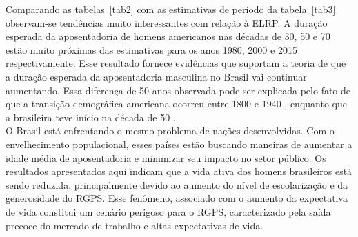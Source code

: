 \documentclass[12pt, 						%
			openright, 					%
			twoside,					%
			a4paper,x					%
			english,					%
			brazil]{abntex2}				%
\begin{document}
	Comparando as tabelas~\ref{tab2} com as estimativas de período da tabela~\ref{tab3} observam-se tendências muito interessantes com relação à ELRP. A duração esperada da aposentadoria de homens americanos nas décadas de 30, 50 e 70 estão muito próximas das estimativas para os anos 1980, 2000 e 2015 respectivamente. Esse resultado fornece evidências que suportam a teoria de que a duração esperada da aposentadoria masculina no Brasil  vai continuar aumentando. Essa diferença de 50 anos observada pode ser explicada pelo fato de que a transição demográfica americana ocorreu entre 1800 e 1940 \cite{greenwood2002us}, enquanto que a brasileira teve início na década de 50 \cite{vasconcelos2012transiccao}. \\
	O Brasil está enfrentando o mesmo problema de nações desenvolvidas. Com o envelhecimento populacional, esses países estão buscando maneiras de aumentar a idade média de aposentadoria e minimizar seu impacto no setor público. Os resultados apresentados aqui indicam que a vida ativa dos homens brasileiros está sendo reduzida, principalmente devido ao aumento do nível de escolarização e da generosidade do RGPS. Esse fenômeno, associado com o aumento da expectativa de vida constitui um cenário perigoso para o RGPS, caracterizado pela saída precoce do mercado de trabalho e altas expectativas de vida.

    
\end{document}
